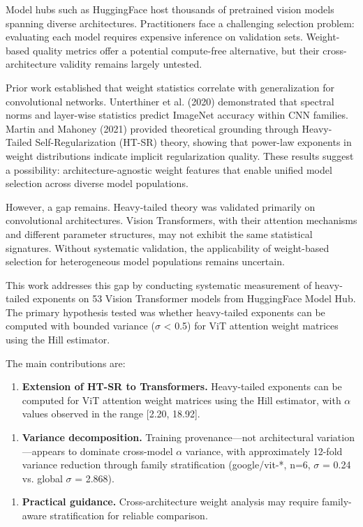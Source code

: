 
Model hubs such as HuggingFace host thousands of pretrained vision models spanning diverse architectures. Practitioners face a challenging selection problem: evaluating each model requires expensive inference on validation sets. Weight-based quality metrics offer a potential compute-free alternative, but their cross-architecture validity remains largely untested.

Prior work established that weight statistics correlate with generalization for convolutional networks. Unterthiner et al. (2020) demonstrated that spectral norms and layer-wise statistics predict ImageNet accuracy within CNN families. Martin and Mahoney (2021) provided theoretical grounding through Heavy-Tailed Self-Regularization (HT-SR) theory, showing that power-law exponents in weight distributions indicate implicit regularization quality. These results suggest a possibility: architecture-agnostic weight features that enable unified model selection across diverse model populations.

However, a gap remains. Heavy-tailed theory was validated primarily on convolutional architectures. Vision Transformers, with their attention mechanisms and different parameter structures, may not exhibit the same statistical signatures. Without systematic validation, the applicability of weight-based selection for heterogeneous model populations remains uncertain.

This work addresses this gap by conducting systematic measurement of heavy-tailed exponents on 53 Vision Transformer models from HuggingFace Model Hub. The primary hypothesis tested was whether heavy-tailed exponents can be computed with bounded variance ($\sigma$ < 0.5) for ViT attention weight matrices using the Hill estimator.

The main contributions are:

\begin{enumerate}
\item \textbf{Extension of HT-SR to Transformers.} Heavy-tailed exponents can be computed for ViT attention weight matrices using the Hill estimator, with $\alpha$ values observed in the range [2.20, 18.92].
\end{enumerate}

\begin{enumerate}
\item \textbf{Variance decomposition.} Training provenance---not architectural variation---appears to dominate cross-model $\alpha$ variance, with approximately 12-fold variance reduction through family stratification (google/vit-*, n=6, $\sigma$ = 0.24 vs. global $\sigma$ = 2.868).
\end{enumerate}

\begin{enumerate}
\item \textbf{Practical guidance.} Cross-architecture weight analysis may require family-aware stratification for reliable comparison.
\end{enumerate}

